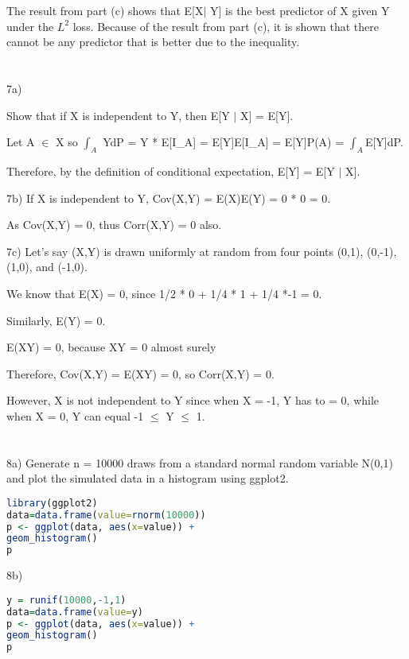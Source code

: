 The result from part (c) shows that E[X$\mid$ Y] is the best predictor of X given Y under the $L^2$ loss. Because of the result from part (c), it is shown that there cannot be any predictor that is better due to the inequality.

\newpage
\section{}

7a) 

Show that if X is independent to Y, then E[Y $\mid$ X] = E[Y].

Let A $\in$ X so $\int_{A}$ YdP = Y * E[I_{A}] = E[Y]E[I_{A}] = E[Y]P(A) = $\int_{A}$E[Y]dP. 

Therefore, by the definition of conditional expectation, E[Y] = E[Y $\mid$ X].

7b) If X is independent to Y, Cov(X,Y) = E(X)E(Y) = 0 * 0 = 0.

As Cov(X,Y) = 0, thus Corr(X,Y) = 0 also.

7c) Let's say (X,Y) is drawn uniformly at random from four points (0,1), (0,-1), (1,0), and (-1,0).

We know that E(X) = 0, since 1/2 * 0 + 1/4 * 1 + 1/4 *-1 = 0.

Similarly, E(Y) = 0.

E(XY) = 0, because XY = 0 almost surely

Therefore, Cov(X,Y) = E(XY) = 0, so Corr(X,Y) = 0.

However, X is not independent to Y since when X = -1, Y has to = 0, while when X = 0, Y can equal -1 $\leq$ Y $\leq$ 1.

\newpage
\section{}

8a) Generate n = 10000 draws from a standard normal random variable N(0,1) and plot the simulated data in a histogram using ggplot2.

\begin{lstlisting}[language=R]
library(ggplot2)
data=data.frame(value=rnorm(10000))
p <- ggplot(data, aes(x=value)) + 
geom_histogram()
p
\end{lstlisting}


8b)
\begin{lstlisting}[language=R]
y = runif(10000,-1,1)
data=data.frame(value=y)
p <- ggplot(data, aes(x=value)) + 
geom_histogram()
p
\end{lstlisting}


